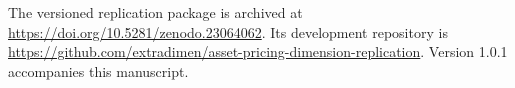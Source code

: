 The versioned replication package is archived at \url{https://doi.org/10.5281/zenodo.23064062}. Its development repository is \url{https://github.com/extradimen/asset-pricing-dimension-replication}. Version 1.0.1 accompanies this manuscript.
